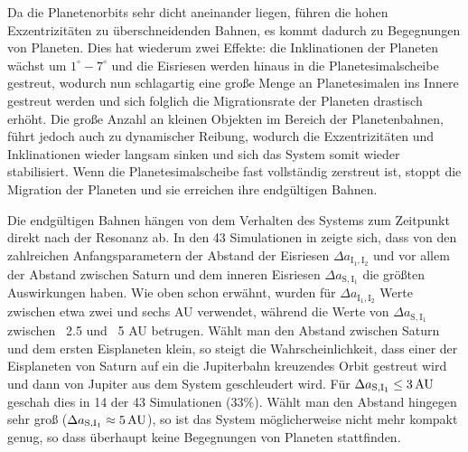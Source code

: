 \documentclass[12pt,a4paper,twoside]{article}
\renewcommand{\cite}{\citep}
\begin{document}
Da die Planetenorbits sehr dicht aneinander liegen, führen die hohen Exzentrizitäten zu überschneidenden Bahnen\cite{Tsiganis2005}, es kommt dadurch zu Begegnungen von Planeten.
Dies hat wiederum zwei Effekte: die Inklinationen der Planeten wächst um $1^\circ-7^\circ$ und die Eisriesen werden hinaus in die Planetesimalscheibe gestreut,
wodurch nun schlagartig eine große Menge an Planetesimalen ins Innere gestreut werden und sich folglich die Migrationsrate der Planeten drastisch erhöht\cite{Tsiganis2005}.
Die große Anzahl an kleinen Objekten im Bereich der Planetenbahnen, führt jedoch auch zu dynamischer Reibung,
wodurch die Exzentrizitäten und Inklinationen wieder langsam sinken und sich das System somit wieder stabilisiert\cite{Tsiganis2005}.
Wenn die Planetesimalscheibe fast vollständig zerstreut ist, stoppt die Migration der Planeten und sie erreichen ihre endgültigen Bahnen\cite{Tsiganis2005}.

\newcommand{\DII}{\Delta a_{\mathrm{I}_1,\mathrm{I}_2}}
\newcommand{\DSI}{\Delta a_{\mathrm{S},\mathrm{I}_1}}
Die endgültigen Bahnen hängen von dem Verhalten des Systems zum Zeitpunkt direkt nach der Resonanz ab. In den 43 Simulationen in \cite{Tsiganis2005} zeigte sich, dass von den zahlreichen Anfangsparametern der Abstand der Eisriesen $\DII$ und vor allem der Abstand zwischen Saturn und dem inneren Eisriesen $\DSI$ die größten Auswirkungen haben\cite{Tsiganis2005}.
Wie oben schon erwähnt, wurden für $\DII$ Werte zwischen etwa zwei und sechs AU verwendet, während die Werte von $\DSI$ zwischen ~2.5 und ~5 AU betrugen\cite{Tsiganis2005}.
Wählt man den Abstand zwischen Saturn und dem ersten Eisplaneten klein, so steigt die Wahrscheinlichkeit, dass einer der Eisplaneten von Saturn auf ein die Jupiterbahn kreuzendes Orbit gestreut wird und dann von Jupiter aus dem System geschleudert wird. Für $\DSI \le \unit[3]{AU} $ geschah dies in 14 der 43 Simulationen (33\%).
Wählt man den Abstand hingegen sehr groß ($\DSI \approx \unit[5]{AU}$), so ist das System möglicherweise nicht mehr kompakt genug, so dass überhaupt keine Begegnungen von Planeten stattfinden.
\end{document}
